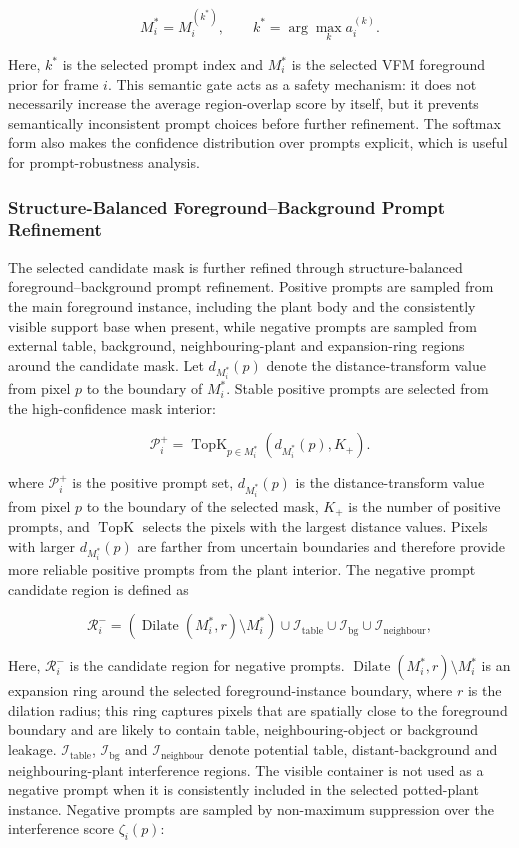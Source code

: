 \documentclass[a4paper]{cas-sc}
\begin{document}
\[
M_i^{*}=M_i^{(k^{*})},\qquad
k^{*}=\arg\max_{k} a_i^{(k)} .
\]

Here, \(k^*\) is the selected prompt index and \(M_i^*\) is the selected VFM foreground prior for frame \(i\). This semantic gate acts as a safety mechanism: it does not necessarily increase the average region-overlap score by itself, but it prevents semantically inconsistent prompt choices before further refinement. The softmax form also makes the confidence distribution over prompts explicit, which is useful for prompt-robustness analysis.

\subsubsection{Structure-Balanced Foreground--Background Prompt Refinement}\label{sec:foreground-background-refinement}

The selected candidate mask is further refined through structure-balanced foreground--background prompt refinement. Positive prompts are sampled from the main foreground instance, including the plant body and the consistently visible support base when present, while negative prompts are sampled from external table, background, neighbouring-plant and expansion-ring regions around the candidate mask. Let \(d_{M_i^{*}}(p)\) denote the distance-transform value from pixel \(p\) to the boundary of \(M_i^{*}\). Stable positive prompts are selected from the high-confidence mask interior:

\[
\mathcal{P}_i^{+}=\operatorname{TopK}_{p\in M_i^{*}}
\left(d_{M_i^{*}}(p),K_{+}\right).
\]

where \(\mathcal{P}_i^+\) is the positive prompt set, \(d_{M_i^*}(p)\) is the distance-transform value from pixel \(p\) to the boundary of the selected mask, \(K_+\) is the number of positive prompts, and \(\operatorname{TopK}\) selects the pixels with the largest distance values. Pixels with larger \(d_{M_i^*}(p)\) are farther from uncertain boundaries and therefore provide more reliable positive prompts from the plant interior. The negative prompt candidate region is defined as

\[
\mathcal{R}_i^{-}=\left(\operatorname{Dilate}\left(M_i^{*},r\right)\setminus M_i^{*}\right)
\cup \mathcal{I}_{\text{table}}
\cup \mathcal{I}_{\text{bg}}
\cup \mathcal{I}_{\text{neighbour}},
\]

Here, \(\mathcal{R}_i^-\) is the candidate region for negative prompts. \(\operatorname{Dilate}(M_i^*,r)\setminus M_i^*\) is an expansion ring around the selected foreground-instance boundary, where \(r\) is the dilation radius; this ring captures pixels that are spatially close to the foreground boundary and are likely to contain table, neighbouring-object or background leakage. \(\mathcal{I}_{\text{table}}\), \(\mathcal{I}_{\text{bg}}\) and \(\mathcal{I}_{\text{neighbour}}\) denote potential table, distant-background and neighbouring-plant interference regions. The visible container is not used as a negative prompt when it is consistently included in the selected potted-plant instance. Negative prompts are sampled by non-maximum suppression over the interference score \(\zeta_i(p)\):
\end{document}

